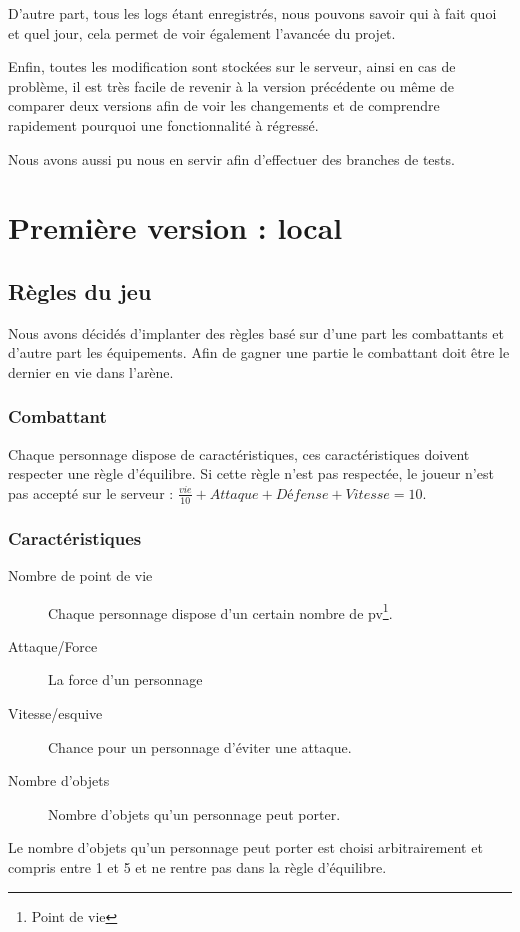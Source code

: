 \documentclass[12pt,a4paper,openany]{book}
\begin{document}
	D'autre part, tous les logs étant enregistrés, nous pouvons savoir qui à fait quoi et quel jour, cela permet de voir également l'avancée du projet. 

	Enfin, toutes les modification sont stockées sur le serveur, ainsi en cas de problème, il est très facile de revenir à la version précédente ou même de
	comparer deux versions afin de voir les changements et de comprendre rapidement pourquoi une fonctionnalité à régressé. 

	Nous avons aussi pu nous en servir afin d'effectuer des branches de tests.

	\chapter{Première version : local}
	\section{Règles du jeu}
	Nous avons décidés d'implanter des règles basé sur d'une part les combattants et d'autre part les équipements. Afin de gagner une partie le combattant doit
	être le dernier en vie dans l'arène.
	\subsection{Combattant}
	Chaque personnage dispose de caractéristiques, ces caractéristiques doivent respecter une règle d'équilibre. Si cette règle n'est pas respectée, le joueur
	n'est pas accepté sur le serveur : $\frac{vie}{10} + Attaque + Défense + Vitesse = 10$.
	\subsection{Caractéristiques}
	\begin{description}
		\item[Nombre de point de vie] Chaque personnage dispose d’un certain nombre de pv\footnote{Point de vie}.
		\item[Attaque/Force] La force d'un personnage 
		\item[Vitesse/esquive] Chance pour un personnage d’éviter une attaque.
		\item[Nombre d'objets] Nombre d’objets qu'un personnage peut porter.
	\end{description}

Le nombre d'objets qu'un personnage peut porter est choisi arbitrairement et compris entre 1 et 5 et ne rentre pas dans la règle d'équilibre.
\end{document}
